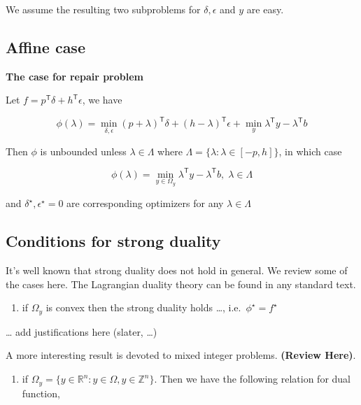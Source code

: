 \documentclass[
  a4paper,
,tablecaptionabove
]{scrartcl}
\numberwithin{equation}{section}
\providecommand{\tightlist}{%
  \setlength{\itemsep}{0pt}\setlength{\parskip}{0pt}}
\begin{document}
We assume the resulting two subproblems for \(\delta, \epsilon\) and
\(y\) are easy.

\hypertarget{affine-case}{%
  \subsection{Affine case}\label{affine-case}}

\textbf{The case for repair problem}

Let \(f=p^\mathsf{T}\delta + h^\mathsf{T} \epsilon\), we have

\[\phi(\lambda) = \min_{\delta, \epsilon} (p+ \lambda)^\mathsf{T}\delta + (h - \lambda)^\mathsf{T} \epsilon+ \min_y \lambda^\mathsf{T} y - \lambda^\mathsf{T} b\]

Then \(\phi\) is unbounded unless \(\lambda \in \Lambda\) where
\(\Lambda = \{\lambda: \lambda \in [-p, h]\}\), in which case

\[\phi(\lambda) = \min_{y\in \Omega_y} \lambda^\mathsf{T} y - \lambda^\mathsf{T} b,\; \lambda\in \Lambda\]

and \(\delta^\star, \epsilon^\star = 0\) are corresponding optimizers
for any \(\lambda \in \Lambda\)

\hypertarget{conditions-for-strong-duality}{%
  \subsection{Conditions for strong
    duality}\label{conditions-for-strong-duality}}

It's well known that strong duality does not hold in general. We review
some of the cases here. The Lagrangian duality theory can be found in
any standard text.

\begin{enumerate}
  \def\labelenumi{(\alph{enumi})}
  \tightlist
  \item
        if \(\Omega_y\) is convex then the strong duality holds \ldots,
        i.e.~\(\phi^\star = f^\star\)
\end{enumerate}

\ldots{} add justifications here (slater, \ldots)

A more interesting result is devoted to mixed integer problems.
\textbf{(Review Here)}.

\begin{enumerate}
  \def\labelenumi{(\alph{enumi})}
  \setcounter{enumi}{1}
  \tightlist
  \item
        if
        \(\Omega_y = \{y \in \mathbb R^n: y \in \Omega, y\in \mathbb Z^n\}\).
        Then we have the following relation for dual function,
\end{enumerate}
\end{document}
